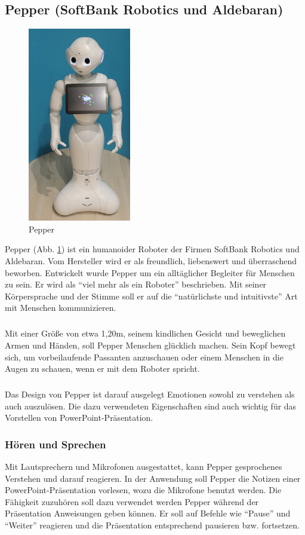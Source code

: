 \subsection{Pepper (SoftBank Robotics und Aldebaran)}\label{sec:pepper}
\begin{figure}
  \centering  
     \includegraphics[width=0.4\textwidth]{pepper}
  \caption{Pepper \cite{AbbildungPepper}}
  \label{fig:pepper}
\end{figure}
Pepper (Abb. \ref{fig:pepper}) ist ein humanoider Roboter der Firmen SoftBank
Robotics und Aldebaran.
Vom Hersteller wird er als freundlich, liebenswert und überraschend beworben.
Entwickelt wurde Pepper um ein alltäglicher Begleiter für Menschen zu sein. Er
wird als "`viel mehr als ein Roboter"' beschrieben. Mit seiner Körpersprache und
der Stimme soll er auf die "`natürlichste und intuitivste"' Art mit Menschen
kommunizieren. \cite{SoftBank2018}

\subparagraph{}
Mit einer Größe von etwa 1,20m, seinem kindlichen Gesicht und beweglichen Armen
und Händen, soll Pepper Menschen glücklich machen. Sein Kopf bewegt sich, um
vorbeilaufende Passanten anzuschauen oder einem Menschen in die Augen zu
schauen, wenn er mit dem Roboter spricht. \cite{Markowitz2015}

\subparagraph{}
Das Design von Pepper ist darauf ausgelegt Emotionen sowohl zu verstehen als
auch auszulösen. Die dazu verwendeten Eigenschaften sind auch wichtig für das
Vorstellen von PowerPoint-Präsentation.

\subsubsection{Hören und Sprechen}\label{sec:hoeren-und-sehen}
Mit Lautsprechern und Mikrofonen ausgestattet, kann Pepper gesprochenes
Verstehen und darauf reagieren. \cite{SoftBankII2018} In der Anwendung soll
Pepper die Notizen einer PowerPoint-Präsentation vorlesen, wozu die Mikrofone benutzt werden. Die
Fähigkeit zuzuhören soll dazu verwendet werden Pepper während der Präsentation
Anweisungen geben können. Er soll auf Befehle wie "`Pause"' und "`Weiter"'
reagieren und die Präsentation entsprechend pausieren bzw. fortsetzen.

